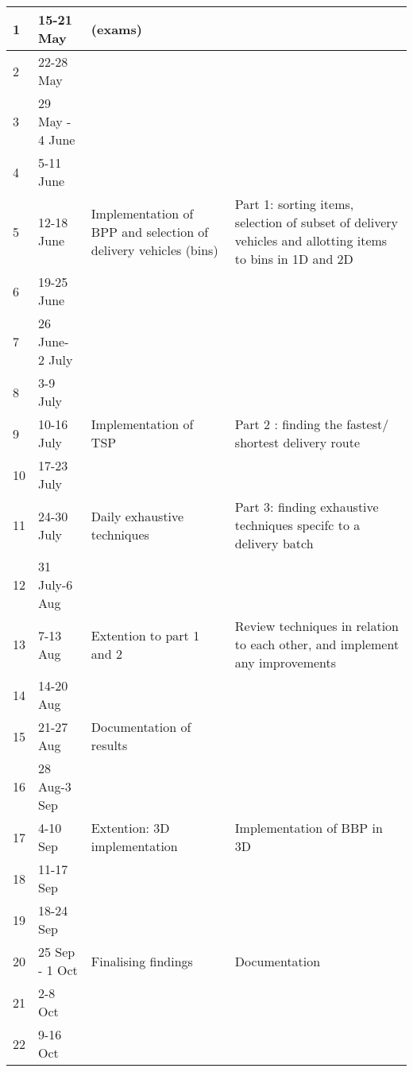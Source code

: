 \begin{center}
\begin{tabular}{ | m{1.5cm} | m{2cm}| m{4cm} |m{5cm} |} 
\hline

1	&15-21 May 	&(exams)	&	\\ \hline
2	&22-28 May	&	&	\\ \hline
3	&29 May -  4 June	&	&	\\ \hline
4	&5-11 June	&	&	\\ \hline
5	&12-18 June	&Implementation of BPP and selection of delivery  vehicles (bins)	&Part 1: sorting items, selection of subset of delivery vehicles and allotting items to bins in 1D and 2D	\\ \hline
6	&19-25 June	&	&	\\ \hline
7	&26 June- 2 July	&	&	\\ \hline
8	&3-9 July	&	&	\\ \hline
9	&10-16 July	&Implementation of TSP 	&Part 2 : finding the fastest/ shortest delivery route	\\ \hline
10	&17-23 July	&	&	\\ \hline
11	&24-30 July	&Daily exhaustive techniques	&Part 3: finding exhaustive techniques specifc to a delivery batch	\\ \hline
12	&31 July-6 Aug	&	&	\\ \hline
13	&7-13 Aug	&Extention to part 1 and 2	&Review techniques in relation to each other, and implement any improvements	\\ \hline
14	&14-20 Aug	&	&	\\ \hline
15	&21-27 Aug	&Documentation of results	&	\\ \hline
16	&28 Aug-3 Sep	&	&	\\ \hline
17	&4-10 Sep	&Extention: 3D implementation	&Implementation of BBP in 3D	\\ \hline
18	&11-17 Sep	&	&	\\ \hline
19	&18-24 Sep	&	&	\\ \hline
20	&25 Sep - 1 Oct	&Finalising findings	&Documentation	\\ \hline
21	&2-8 Oct	&	&	\\ \hline
22	&9-16 Oct	&	&	\\ \hline



\end{tabular}
\end{center}


